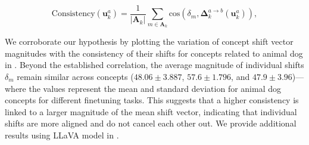     \[
    \text{Consistency}(\bm{u}_{k}^a) = \frac{1}{|\bm{A}_k|} \sum_{m \in \bm{A}_k} \text{cos}(\delta_m, \bm{\Delta}_k^{a \to b}(\bm{u}^a_k)),
    \]

We corroborate our hypothesis by plotting the variation of concept shift vector magnitudes with the consistency of their shifts for concepts related to animal dog in . Beyond the established correlation, the average magnitude of individual shifts $\delta_m$ remain similar across concepts ($48.06 \pm 3.887$, $57.6 \pm 1.796$, and $47.9 \pm 3.96$)— where the values represent the mean and standard deviation for animal dog concepts for different finetuning tasks. This suggests that a higher consistency is linked to a larger magnitude of the mean shift vector, indicating that individual shifts are more aligned and do not cancel each other out. \newline
We provide additional results using LLaVA model in . 






    
    

    


    

    
    


















    



    



    



    








    

    

    
    












